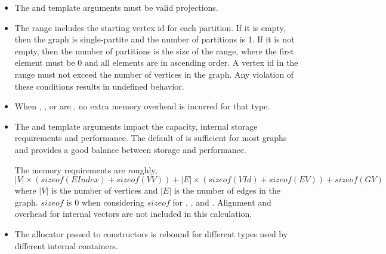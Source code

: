 \begin{itemdescr}
\begin{itemize}
            \item The  and  template arguments must be valid projections.
            \item The  range includes the starting vertex id for each partition. If it is empty, then the graph is single-partite
                    and the number of partitions is 1. If it is not empty, then the number of partitions is the size of the range, where the first element
                    must be 0 and all elements are in ascending order. A vertex id in the range must not exceed the number of 
                    vertices in the graph. Any violation of these conditions results in undefined behavior.
        \end{itemize}

    \pnum\effects
        \begin{itemize}
            \item When , , or  are , no extra memory overhead is incurred for that type.
         \end{itemize}
    \pnum\remarks 
        \begin{itemize}
            \item  The  and  template arguments impact the capacity, internal storage requirements and performance.
                   The default of  is sufficient for most graphs and provides a good balance between storage and performance.

                   The memory requirements are roughly, 
                        \[|V| \times (sizeof(EIndex)+sizeof(VV)) + |E| \times (sizeof(VId) + sizeof(EV)) + sizeof(GV)\]
                   where $|V|$ is the number of vertices and $|E|$ is the number of edges in the graph. $sizeof$  is 0
                   when considering $sizeof$ for , , and . Alignment and overhead for internal vectors are 
                   not included in this calculation.
            \item The allocator passed to constructors is rebound for different types used by different internal containers.
        \end{itemize}
\end{itemdescr}

